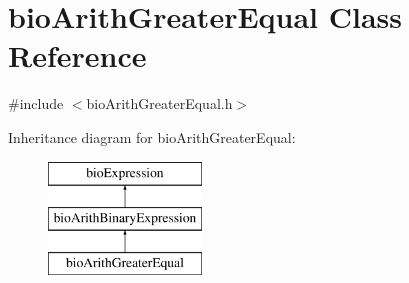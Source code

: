 \hypertarget{classbio_arith_greater_equal}{}\section{bio\+Arith\+Greater\+Equal Class Reference}
\label{classbio_arith_greater_equal}


{\ttfamily \#include $<$bio\+Arith\+Greater\+Equal.\+h$>$}

Inheritance diagram for bio\+Arith\+Greater\+Equal\+:\begin{figure}[H]
\begin{center}
\leavevmode
\includegraphics[height=3.000000cm]{classbio_arith_greater_equal}
\end{center}
\end{figure}

